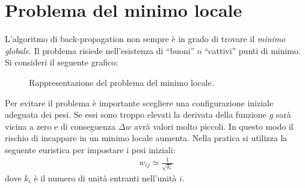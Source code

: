 
\newpage

\section{Problema del minimo locale} %
\label{sec:problema_del_minimo_locale}
L'algoritmo di back-propagation non sempre è in grado di trovare il \emph{minimo globale}. Il problema risiede nell'esistenza di “buoni” o “cattivi” punti di minimo. Si consideri il seguente grafico:

\begin{figure}[h!]
	\centering
	\caption{Rappresentazione del problema del minimo locale.}
\end{figure}

Per evitare il problema è importante scegliere una configurazione iniziale adeguata dei pesi. Se essi sono troppo elevati la derivata della funzione $g$ sarà vicina a zero e di conseguenza $\Delta w$ avrà valori molto piccoli. In questo modo il rischio di incappare in un minimo locale aumenta. Nella pratica si utilizza la seguente euristica per impostare i pesi iniziali:
\begin{align*}
	w_{ij} \simeq \frac{1}{\sqrt{k_i}}
\end{align*}
dove $k_i$ è il numero di unità entranti nell'unità $i$.\\


